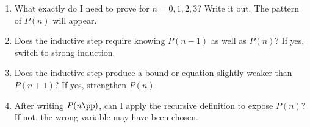 \begin{remark}
\begin{enumerate}[itemsep=3pt]
  \item What exactly do I need to prove for $n = 0, 1, 2, 3$?
    Write it out. The pattern of $P(n)$ will appear.
  \item Does the inductive step require knowing $P(n-1)$ as well as
    $P(n)$? If yes, switch to strong induction.
  \item Does the inductive step produce a bound or equation slightly
    weaker than $P(n+1)$? If yes, strengthen $P(n)$.
  \item After writing $P(n\pp)$, can I apply the recursive definition
    to expose $P(n)$? If not, the wrong variable may have been chosen.
\end{enumerate}
\end{remark}
